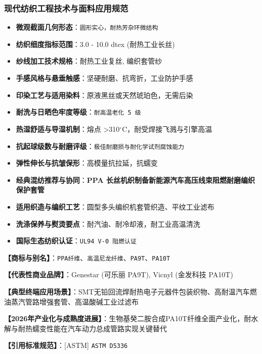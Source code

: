\documentclass[11pt,openright,twoside,UTF8]{ctexbook}
\begin{document}
\subsubsection*{现代纺织工程技术与面料应用规范}
\begin{itemize} \setlength{\itemsep}{2pt}
    \item \textbf{微观截面几何形态}：\texttt{圆形实心，耐热芳杂环微结构}
    \item \textbf{纺织细度指标范围}：3.0 - 10.0 dtex (耐热工业长丝)
    \item \textbf{纱线加工技术规格}：耐热工业复丝, 编织套管纱
    \item \textbf{手感风格与悬垂触感}：坚硬耐磨、抗弯折，工业防护手感
    \item \textbf{印染工艺与适用染料}：原液黑丝或天然琥珀色，无需后染
    \item \textbf{耐洗与日晒色牢度等级}：\texttt{耐高温老化 5 级}
    \item \textbf{热湿舒适与导湿机制}：熔点 \textgreater{}310$^\circ\mathrm{C}$，耐受焊接飞溅与引擎高温
    \item \textbf{抗起球级数与耐磨评级}：\texttt{极佳耐磨损与耐化学试剂腐蚀能力}
    \item \textbf{弹性伸长与抗皱保形}：高模量抗拉延，抗蠕变
    \item \textbf{经典混纺推荐与协同}：\textbf{PPA 长丝机织制备新能源汽车高压线束阻燃耐磨编织保护套管}
    \item \textbf{适用织造与编织工艺}：圆型多头编织机套管织造、平纹工业滤布
    \item \textbf{洗涤保养与熨烫要点}：耐汽油、耐冷却液，耐工业高温清洗
    \item \textbf{国际生态纺织认证}：\texttt{UL94 V-0 阻燃认证}
\end{itemize}
\vspace{0.2cm}

\noindent\textbf{【商标与别名】}：\texttt{PPA纤维}、\texttt{高温尼龙纤维}、\texttt{PA9T}、\texttt{PA10T}\par
\noindent\textbf{【代表性商业品牌】}：Genestar (可乐丽 PA9T), Vicnyl (金发科技 PA10T)\par
\noindent\textbf{【典型终端应用场景】}：SMT无铅回流焊耐热电子元器件包装织物、高耐温汽车燃油蒸汽管路增强套管、高温酸碱工业过滤布\par
\noindent\textbf{【2026年产业化与成熟度进展】}：生物基癸二胺合成PA10T纤维全面产业化，耐水解与耐热蠕变性能在汽车动力总成管路实现关键替代\par
\noindent\textbf{【引用标准规范】}：[ASTM] \texttt{ASTM D5336}\par
\vspace{0.5cm}
\end{document}
